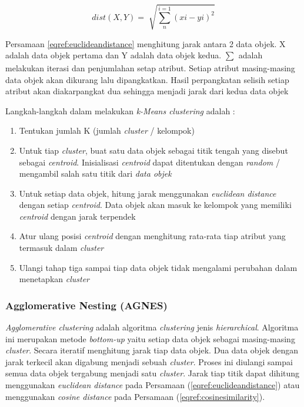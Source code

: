 \begin{equation}
	dist(X,Y) = \sqrt[]{\sum_{n}^{i=1}(xi-yi)^2}
	\label{eqref:euclideandistance}
\end{equation}

Persamaan \eqref{eqref:euclideandistance} menghitung jarak antara 2 data objek. X adalah data objek pertama dan Y adalah data objek kedua. $\sum_{}^{}$ adalah melakukan iterasi dan penjumlahan setap atribut. Setiap atribut masing-masing data objek akan dikurang lalu dipangkatkan. Hasil perpangkatan selisih setiap atribut akan diakarpangkat dua sehingga menjadi jarak dari kedua data objek

Langkah-langkah dalam melakukan \textit{k-Means clustering} adalah : 
\begin{enumerate}
\item Tentukan jumlah K (jumlah \textit{cluster} / kelompok)
\item Untuk tiap \textit{cluster}, buat satu data objek sebagai titik tengah yang disebut sebagai \textit{centroid}. Inisialisasi \textit{centroid} dapat ditentukan dengan \textit{random} / mengambil salah satu titik dari \textit{data objek} 
\item Untuk setiap data objek, hitung jarak menggunakan \textit{euclidean distance} dengan setiap \textit{centroid}. Data objek akan masuk ke kelompok yang memiliki \textit{centroid} dengan jarak terpendek
\item Atur ulang posisi \textit{centroid} dengan menghitung rata-rata tiap atribut yang termasuk dalam \textit{cluster} 
\item Ulangi tahap tiga sampai tiap data objek tidak mengalami perubahan dalam menetapkan \textit{cluster}
\end{enumerate}



\subsubsection{Agglomerative Nesting (AGNES)}
\textit{Agglomerative clustering} adalah algoritma \textit{clustering} jenis \textit{hierarchical}. Algoritma ini merupakan metode \textit{bottom-up} yaitu setiap data objek sebagai masing-masing \textit{cluster}. Secara iteratif menghitung jarak tiap data objek. Dua data objek dengan jarak terkecil akan digabung menjadi sebuah \textit{cluster}. Proses ini diulangi sampai semua data objek tergabung menjadi satu \textit{cluster}. Jarak tiap titik dapat dihitung menggunakan \textit{euclidean distance} pada Persamaan (\ref{eqref:euclideandistance}) atau menggunakan \textit{cosine distance} pada Persamaan (\ref{eqref:cosinesimilarity}). 


